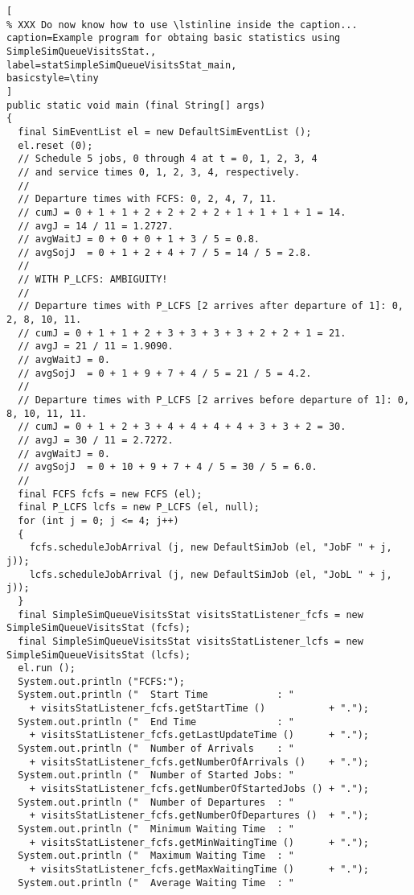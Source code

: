 \documentclass[12pt]{book}
\begin{document}
\begin{lstlisting}[
% XXX Do now know how to use \lstinline inside the caption...
caption=Example program for obtaing basic statistics using SimpleSimQueueVisitsStat.,
label=statSimpleSimQueueVisitsStat_main,
basicstyle=\tiny
]
public static void main (final String[] args)
{
  final SimEventList el = new DefaultSimEventList ();
  el.reset (0);
  // Schedule 5 jobs, 0 through 4 at t = 0, 1, 2, 3, 4
  // and service times 0, 1, 2, 3, 4, respectively.
  //
  // Departure times with FCFS: 0, 2, 4, 7, 11.
  // cumJ = 0 + 1 + 1 + 2 + 2 + 2 + 2 + 1 + 1 + 1 + 1 = 14.
  // avgJ = 14 / 11 = 1.2727.
  // avgWaitJ = 0 + 0 + 0 + 1 + 3 / 5 = 0.8.
  // avgSojJ  = 0 + 1 + 2 + 4 + 7 / 5 = 14 / 5 = 2.8.
  //
  // WITH P_LCFS: AMBIGUITY!
  //
  // Departure times with P_LCFS [2 arrives after departure of 1]: 0, 2, 8, 10, 11.
  // cumJ = 0 + 1 + 1 + 2 + 3 + 3 + 3 + 3 + 2 + 2 + 1 = 21.
  // avgJ = 21 / 11 = 1.9090.
  // avgWaitJ = 0.
  // avgSojJ  = 0 + 1 + 9 + 7 + 4 / 5 = 21 / 5 = 4.2.
  //
  // Departure times with P_LCFS [2 arrives before departure of 1]: 0, 8, 10, 11, 11.
  // cumJ = 0 + 1 + 2 + 3 + 4 + 4 + 4 + 4 + 3 + 3 + 2 = 30.
  // avgJ = 30 / 11 = 2.7272.    
  // avgWaitJ = 0.
  // avgSojJ  = 0 + 10 + 9 + 7 + 4 / 5 = 30 / 5 = 6.0.
  //
  final FCFS fcfs = new FCFS (el);
  final P_LCFS lcfs = new P_LCFS (el, null);
  for (int j = 0; j <= 4; j++)
  {
    fcfs.scheduleJobArrival (j, new DefaultSimJob (el, "JobF " + j, j));
    lcfs.scheduleJobArrival (j, new DefaultSimJob (el, "JobL " + j, j));
  }
  final SimpleSimQueueVisitsStat visitsStatListener_fcfs = new SimpleSimQueueVisitsStat (fcfs);
  final SimpleSimQueueVisitsStat visitsStatListener_lcfs = new SimpleSimQueueVisitsStat (lcfs);
  el.run ();
  System.out.println ("FCFS:");
  System.out.println ("  Start Time            : "
    + visitsStatListener_fcfs.getStartTime ()           + ".");
  System.out.println ("  End Time              : "
    + visitsStatListener_fcfs.getLastUpdateTime ()      + ".");
  System.out.println ("  Number of Arrivals    : "
    + visitsStatListener_fcfs.getNumberOfArrivals ()    + ".");
  System.out.println ("  Number of Started Jobs: "
    + visitsStatListener_fcfs.getNumberOfStartedJobs () + ".");
  System.out.println ("  Number of Departures  : "
    + visitsStatListener_fcfs.getNumberOfDepartures ()  + ".");
  System.out.println ("  Minimum Waiting Time  : "
    + visitsStatListener_fcfs.getMinWaitingTime ()      + ".");
  System.out.println ("  Maximum Waiting Time  : "
    + visitsStatListener_fcfs.getMaxWaitingTime ()      + ".");
  System.out.println ("  Average Waiting Time  : "

\end{lstlisting}
\end{document}
